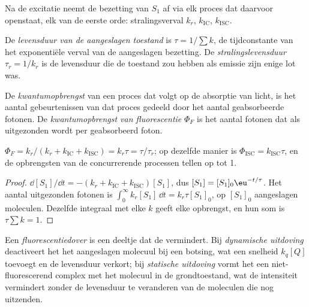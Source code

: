 Na de excitatie neemt de bezetting van $S_1$ af via elk proces dat
daarvoor openstaat, elk van de eerste orde: stralingsverval $k_r$,  $k_{\mathrm{IC}}$,
 $k_{\mathrm{ISC}}$.

\begin{definition}\label{def:b3:electronic-spectroscopy:lifetime}
De \emph{levensduur van de aangeslagen toestand} is $\tau =
1/\sum k$, de tijdconstante van het exponentiële verval van de aangeslagen
bezetting. De \emph{stralingslevensduur} $\tau_r =
1/k_r$ is de levensduur die de toestand zou hebben als emissie zijn
enige lot was.
\end{definition}

\begin{definition}[Kwantumopbrengst]\label{def:b3:electronic-spectroscopy:quantum-yield}
De \emph{kwantumopbrengst} van een proces dat
volgt op de absorptie van licht, is het aantal gebeurtenissen van dat
proces gedeeld door het aantal geabsorbeerde fotonen. De
\emph{kwantumopbrengst van
fluorescentie} $\Phi_F$ is het
aantal fotonen dat als  uitgezonden wordt per geabsorbeerd
foton.
\end{definition}

\begin{proposition}\label{prop:b3:electronic-spectroscopy:quantum-yield}
$\Phi_F = k_r/(k_r + k_{\mathrm{IC}} + k_{\mathrm{ISC}}) = k_r\tau = \tau/\tau_r$; op dezelfde
manier is
$\Phi_{\mathrm{ISC}} = k_{\mathrm{ISC}}\tau$, en de opbrengsten van de
concurrerende processen tellen op tot 1.
\end{proposition}

\begin{proof}
$\dd[S_1]/\dd t = -(k_r + k_{\mathrm{IC}} + k_{\mathrm{ISC}})[S_1]$, dus $[S_1] = [S_1]_0\eu^{-t/\tau}$.
Het aantal uitgezonden fotonen is $\int_0^\infty k_r[S_1]\,\dd t = k_r\tau[S_1]_0$, op
$[S_1]_0$ aangeslagen moleculen. Dezelfde integraal met elke $k$ geeft
elke opbrengst,
en hun som is $\tau\sum k = 1$.
\end{proof}

\begin{definition}\label{def:b3:electronic-spectroscopy:quencher}
Een \emph{fluorescentiedover} is een deeltje dat
de  vermindert. Bij \emph{dynamische
uitdoving} deactiveert het het aangeslagen
molecuul bij een botsing, wat een snelheid $k_q[Q]$ toevoegt en de
levensduur verkort; bij \emph{statische uitdoving}
vormt het een niet-fluorescerend complex met het molecuul in de
grondtoestand, wat de intensiteit vermindert zonder de levensduur te
veranderen van de moleculen die nog uitzenden.
\end{definition}


